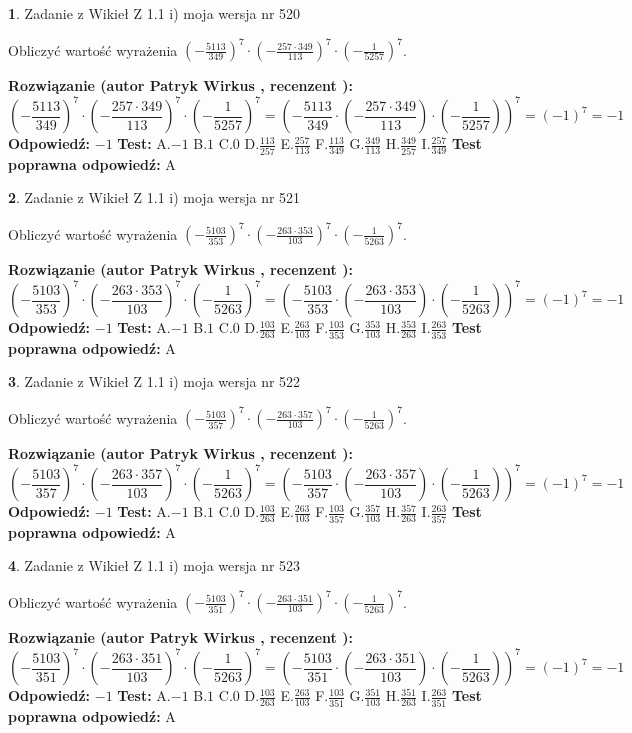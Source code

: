 \documentclass[12pt, a4paper]{article}
\theoremstyle{definition} %
\newtheorem{zad}{}
\newcommand{\zadStart}[1]{\begin{zad}#1\newline}
\newcommand{\zadStop}{\end{zad}}
\newcommand{\rozwStart}[2]{\noindent \textbf{Rozwiązanie (autor #1 , recenzent #2): }\newline}
\newcommand{\rozwStop}{\newline}
\newcommand{\odpStart}{\noindent \textbf{Odpowiedź:}\newline}
\newcommand{\odpStop}{\newline}
\newcommand{\testStart}{\noindent \textbf{Test:}\newline}
\newcommand{\testStop}{\newline}
\newcommand{\kluczStart}{\noindent \textbf{Test poprawna odpowiedź:}\newline}
\newcommand{\kluczStop}{\newline}
\begin{document}
\zadStart{Zadanie z Wikieł Z 1.1 i) moja wersja nr 520}

Obliczyć wartość wyrażenia $(-\frac{5113}{349})^{7} \cdot (-\frac{257 \cdot 349}{113})^{7} \cdot (-\frac{1}{5257})^{7}$.
\zadStop
\rozwStart{Patryk Wirkus}{}
$$(-\frac{5113}{349})^{7} \cdot (-\frac{257 \cdot 349}{113})^{7} \cdot (-\frac{1}{5257})^{7} = (-\frac{5113}{349} \cdot (-\frac{257 \cdot 349}{113}) \cdot (-\frac{1}{5257}))^{7} = (-1)^{7} = -1$$
\rozwStop
\odpStart
$-1$
\odpStop
\testStart
A.$-1$ B.$1$ C.$0$ D.$\frac{113}{257}$ E.$\frac{257}{113}$
F.$\frac{113}{349}$ G.$\frac{349}{113}$
H.$\frac{349}{257}$
I.$\frac{257}{349}$
\testStop
\kluczStart
A
\kluczStop



\zadStart{Zadanie z Wikieł Z 1.1 i) moja wersja nr 521}

Obliczyć wartość wyrażenia $(-\frac{5103}{353})^{7} \cdot (-\frac{263 \cdot 353}{103})^{7} \cdot (-\frac{1}{5263})^{7}$.
\zadStop
\rozwStart{Patryk Wirkus}{}
$$(-\frac{5103}{353})^{7} \cdot (-\frac{263 \cdot 353}{103})^{7} \cdot (-\frac{1}{5263})^{7} = (-\frac{5103}{353} \cdot (-\frac{263 \cdot 353}{103}) \cdot (-\frac{1}{5263}))^{7} = (-1)^{7} = -1$$
\rozwStop
\odpStart
$-1$
\odpStop
\testStart
A.$-1$ B.$1$ C.$0$ D.$\frac{103}{263}$ E.$\frac{263}{103}$
F.$\frac{103}{353}$ G.$\frac{353}{103}$
H.$\frac{353}{263}$
I.$\frac{263}{353}$
\testStop
\kluczStart
A
\kluczStop



\zadStart{Zadanie z Wikieł Z 1.1 i) moja wersja nr 522}

Obliczyć wartość wyrażenia $(-\frac{5103}{357})^{7} \cdot (-\frac{263 \cdot 357}{103})^{7} \cdot (-\frac{1}{5263})^{7}$.
\zadStop
\rozwStart{Patryk Wirkus}{}
$$(-\frac{5103}{357})^{7} \cdot (-\frac{263 \cdot 357}{103})^{7} \cdot (-\frac{1}{5263})^{7} = (-\frac{5103}{357} \cdot (-\frac{263 \cdot 357}{103}) \cdot (-\frac{1}{5263}))^{7} = (-1)^{7} = -1$$
\rozwStop
\odpStart
$-1$
\odpStop
\testStart
A.$-1$ B.$1$ C.$0$ D.$\frac{103}{263}$ E.$\frac{263}{103}$
F.$\frac{103}{357}$ G.$\frac{357}{103}$
H.$\frac{357}{263}$
I.$\frac{263}{357}$
\testStop
\kluczStart
A
\kluczStop



\zadStart{Zadanie z Wikieł Z 1.1 i) moja wersja nr 523}

Obliczyć wartość wyrażenia $(-\frac{5103}{351})^{7} \cdot (-\frac{263 \cdot 351}{103})^{7} \cdot (-\frac{1}{5263})^{7}$.
\zadStop
\rozwStart{Patryk Wirkus}{}
$$(-\frac{5103}{351})^{7} \cdot (-\frac{263 \cdot 351}{103})^{7} \cdot (-\frac{1}{5263})^{7} = (-\frac{5103}{351} \cdot (-\frac{263 \cdot 351}{103}) \cdot (-\frac{1}{5263}))^{7} = (-1)^{7} = -1$$
\rozwStop
\odpStart
$-1$
\odpStop
\testStart
A.$-1$ B.$1$ C.$0$ D.$\frac{103}{263}$ E.$\frac{263}{103}$
F.$\frac{103}{351}$ G.$\frac{351}{103}$
H.$\frac{351}{263}$
I.$\frac{263}{351}$
\testStop
\kluczStart
A
\kluczStop
\end{document}

